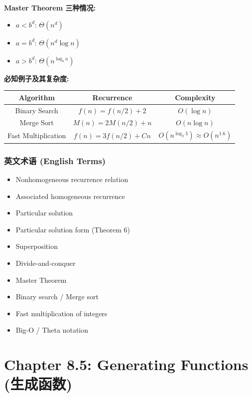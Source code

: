 \documentclass[10pt,a4paper,openany]{ctexbook}
\theoremstyle{definition}
\theoremstyle{remark}
\begin{document}
\textbf{Master Theorem 三种情况:}
\begin{itemize}
\item $a < b^d$: $\Theta(n^d)$
\item $a = b^d$: $\Theta(n^d \log n)$
\item $a > b^d$: $\Theta(n^{\log_b a})$

\end{itemize}

\textbf{必知例子及其复杂度:}
\begin{center}
\begin{tabular}{ccc}
\hline
Algorithm & Recurrence & Complexity \\ \hline
Binary Search & $f(n) = f(n/2) + 2$ & $O(\log n)$ \\
Merge Sort & $M(n) = 2M(n/2) + n$ & $O(n \log n)$ \\
Fast Multiplication & $f(n) = 3f(n/2) + Cn$ & $O(n^{\log_2 3}) \approx O(n^{1.6})$ \\
\hline
\end{tabular}

\end{center}

\subsubsection{英文术语 (English Terms)}

\begin{itemize}
\item Nonhomogeneous recurrence relation
\item Associated homogeneous recurrence
\item Particular solution
\item Particular solution form (Theorem 6)
\item Superposition
\item Divide-and-conquer
\item Master Theorem
\item Binary search / Merge sort
\item Fast multiplication of integers
\item Big-O / Theta notation

\end{itemize}


\section{Chapter 8.5: Generating Functions (生成函数)}
\end{document}
